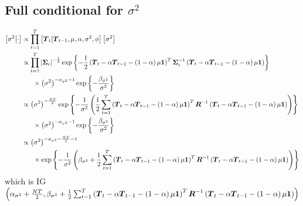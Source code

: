 \documentclass{article}\usepackage[]{graphicx}\usepackage[]{color}
\def\bm#1{\mbox{\boldmath $#1$}}
\begin{document}
\subsection{Full conditional for $\sigma^2$}
%
\begin{align*}
%
\left[ \sigma^2 \middle| \cdot \right] & \propto \prod_{t = 1}^T \left[ \bm{T}_t \middle| \bm{T}_{t - 1}, \mu, \alpha, \sigma^2, \phi \right] \left[ \sigma^2 \right]\\
%
& \propto \prod_{t = 1}^T \left| \bm{\Sigma}_\epsilon \right|^{ - \frac{1} {2} } \exp{ \left\{ - \frac{1} {2} \left( \bm{T}_t  - \alpha \bm{T}_{t - 1} - \left( 1 - \alpha \right) \mu \bm{1} \right)^T \bm{\Sigma}_\epsilon^{ - 1} \left( \bm{T}_t  - \alpha \bm{T}_{t - 1} - \left( 1 - \alpha \right) \mu \bm{1} \right) \right\} }\\
& \hspace{6mm} \times \left( \sigma^2 \right)^{ - \alpha_{\sigma^2} - 1} \exp{ \left\{ - \frac{\beta_{\sigma^2}} {\sigma^2} \right\} } \\
%
& \propto \left( \sigma^2 \right)^{ - \frac{N T} {2} } \exp{ \left\{ - \frac{1} {\sigma^2} \left( \frac{1} {2} \sum_{t = 1}^T \left( \bm{T}_t  - \alpha \bm{T}_{t - 1} - \left( 1 - \alpha \right) \mu \bm{1} \right)^T \bm{R}^{ - 1} \left( \bm{T}_t  - \alpha \bm{T}_{t - 1} - \left( 1 - \alpha \right) \mu \bm{1} \right) \right) \right\} }\\
& \hspace{6mm} \times \left( \sigma^2 \right)^{ - \alpha_{\sigma^2} - 1} \exp{ \left\{ - \frac{\beta_{\sigma^2}} {\sigma^2} \right\} } \\
%
& \propto \left( \sigma^2 \right)^{ - \alpha_{\sigma^2} - \frac{N T} {2} - 1}\\
& \hspace{6mm} \times \exp{ \left\{ - \frac{1} {\sigma^2} \left( \beta_{\sigma^2} + \frac{1} {2} \sum_{t = 1}^T \left( \bm{T}_t  - \alpha \bm{T}_{t - 1} - \left( 1 - \alpha \right) \mu \bm{1} \right)^T \bm{R}^{ - 1} \left( \bm{T}_t  - \alpha \bm{T}_{t - 1} - \left( 1 - \alpha \right) \mu \bm{1} \right) \right) \right\} }\\
%
\end{align*}
%
which is IG$\left( \alpha_{\sigma^2} + \frac{N T} {2}, \beta_{\sigma^2} + \frac{1} {2} \sum_{t = 1}^T \left( \bm{T}_t  - \alpha \bm{T}_{t - 1} - \left( 1 - \alpha \right) \mu \bm{1} \right)^T \bm{R}^{ - 1} \left( \bm{T}_t  - \alpha \bm{T}_{t - 1} - \left( 1 - \alpha \right) \mu \bm{1} \right) \right)$
%
%
\end{document}
